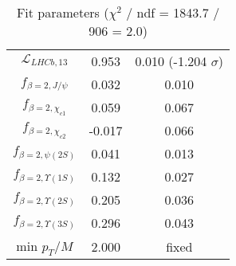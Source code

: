 \begin{table}[h!]
\begin{tabular}{c|c|c}
$\mathcal L_{LHCb,13}$ & 0.953 & 0.010 (-1.204 $\sigma$) \\
$f_{\beta=2,J/\psi}$ & 0.032 & 0.010 \\
$f_{\beta=2,\chi_{c1}}$ & 0.059 & 0.067 \\
$f_{\beta=2,\chi_{c2}}$ & -0.017 & 0.066 \\
$f_{\beta=2,\psi(2S)}$ & 0.041 & 0.013 \\
$f_{\beta=2,\Upsilon(1S)}$ & 0.132 & 0.027 \\
$f_{\beta=2,\Upsilon(2S)}$ & 0.205 & 0.036 \\
$f_{\beta=2,\Upsilon(3S)}$ & 0.296 & 0.043 \\
min $p_T/M$ & 2.000 & fixed \\
\end{tabular}
\caption{Fit parameters ($\chi^2$ / ndf = 1843.7 / 906 = 2.0)}
\end{table}
